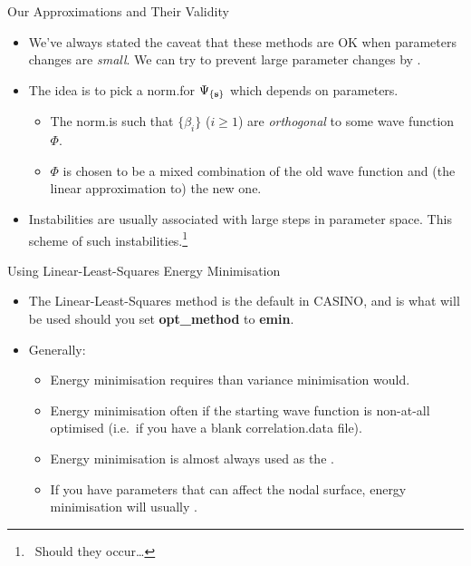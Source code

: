 \documentclass[12pt, pdf, hyperref={draft}, usenames, dvipsnames,
aspectratio=169]{beamer}
\newcommand{\red}[1]{{\bf\color{LancsRed}{#1}}}
\newcommand{\blue}[1]{{\bf\color{NavyBlue}{#1}}}
\newcommand{\green}[1]{{\bf\color{ForestGreen}{#1}}}
\begin{document}
\begin{frame}{Our Approximations and Their Validity}
\begin{itemize}
  \item We've always stated the caveat that these methods are OK when
  parameters changes are \textit{small}. We can try to prevent large parameter
  changes by \blue{semi-orthogonalisation}.
  \item The idea is to pick a norm.\@ for $\Psi_{\{{\bf s}\}}$ which depends on
  parameters.
  \begin{itemize}
    \item The norm.\@ is such that $\{ \beta_i \}$ ($i \geq 1$) are
    \textit{orthogonal} to some wave function $\Phi$.
    \item $\Phi$ is chosen to be a mixed combination of the old wave function
    and (the linear approximation to) the new one.
  \end{itemize}
  \item Instabilities are usually associated with large steps in parameter
  space. This scheme \green{lessens the potential potency} of such
  instabilities.\footnote{\ Should they occur\ldots}
\end{itemize}
\end{frame}


\begin{frame}{Using Linear-Least-Squares Energy Minimisation}
\begin{itemize}
  \item The Linear-Least-Squares method is the default in CASINO, and is what
  will be used should you set \textbf{opt\_method} to \textbf{emin}.
  \item Generally:
  \begin{itemize}
    \item Energy minimisation requires \red{more configurations} than variance
    minimisation would.
    \item Energy minimisation often \red{struggles} if the starting wave function is
    non-at-all optimised (i.e.\ if you have a blank correlation.data file).
    \item Energy minimisation is almost always used as the \blue{last step
    before DMC}.
    \item If you have parameters that can affect the nodal surface,
    energy minimisation will usually \green{lower the energy of the trial wave
    function significantly}.
  \end{itemize}
\end{itemize}
\end{frame}
\end{document}
